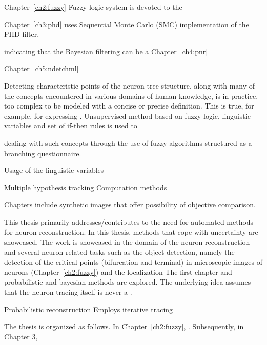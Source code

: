 Chapter~\ref{ch2:fuzzy} Fuzzy logic system is devoted to the 

Chapter~\ref{ch3:phd} uses
Sequential Monte Carlo (SMC) implementation of the PHD filter,

 indicating that the Bayesian filtering can be a 
Chapter~\ref{ch4:pnr}

Chapter~\ref{ch5:ndetchml}

Detecting characteristic points of the neuron tree structure, along with many of the concepts encountered in various domains of human knowledge, is in practice, too complex to be modeled with a concise or precise definition. This is true, for example, for expressing . Unsupervised method based on fuzzy logic, linguistic variables and set of if-then rules is used to 

dealing with such concepts through the use of fuzzy algorithms structured as a branching questionnaire.

Usage of the linguistic variables 

Multiple hypothesis tracking
Computation methods

Chapters include synthetic images that offer possibility of objective comparison.

This thesis primarily addresses/contributes to the need for automated methods for neuron reconstruction. 
In this thesis, methods that cope with uncertainty are showcased. The work is showcased in the domain of the neuron reconstruction and several neuron related tasks such as the object detection, namely the detection of the critical points (bifurcation and terminal) in microscopic images of neurons (Chapter~\ref{ch2:fuzzy}) and the localization  The first chapter  and probabilistic and bayesian methods are explored. The underlying idea assumes that the neuron tracing itself is never a .

Probabilistic reconstruction
Employs iterative tracing


The thesis is organized as follows. In Chapter~\ref{ch2:fuzzy},  . Subsequently, in Chapter 3, 


